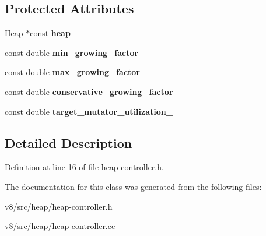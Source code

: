 \subsection*{Protected Attributes}
\begin{DoxyCompactItemize}
\item 
\mbox{\label{classv8_1_1internal_1_1MemoryController_acee6b883f29f47f17e49cca8bddbe4d1}} 
\mbox{\hyperlink{classv8_1_1internal_1_1Heap}{Heap}} $\ast$const {\bfseries heap\+\_\+}
\item 
\mbox{\label{classv8_1_1internal_1_1MemoryController_a12631420f774542fca53ee7cf3133741}} 
const double {\bfseries min\+\_\+growing\+\_\+factor\+\_\+}
\item 
\mbox{\label{classv8_1_1internal_1_1MemoryController_a1debd5984cc27fe59cf91597942947b3}} 
const double {\bfseries max\+\_\+growing\+\_\+factor\+\_\+}
\item 
\mbox{\label{classv8_1_1internal_1_1MemoryController_a9b42d40504361a7247545918c577ac0a}} 
const double {\bfseries conservative\+\_\+growing\+\_\+factor\+\_\+}
\item 
\mbox{\label{classv8_1_1internal_1_1MemoryController_ab81c60e03755790f6bd6a19a7057892d}} 
const double {\bfseries target\+\_\+mutator\+\_\+utilization\+\_\+}
\end{DoxyCompactItemize}


\subsection{Detailed Description}


Definition at line 16 of file heap-\/controller.\+h.



The documentation for this class was generated from the following files\+:\begin{DoxyCompactItemize}
\item 
v8/src/heap/heap-\/controller.\+h\item 
v8/src/heap/heap-\/controller.\+cc\end{DoxyCompactItemize}
